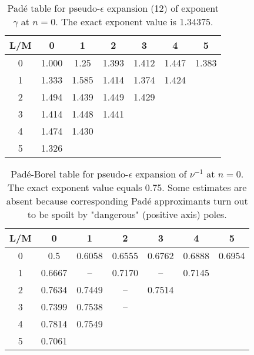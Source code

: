 \documentclass[aps,prb,preprint,showpacs,preprintnumbers,amsmath,amssymb]{revtex4}
\begin{document}
\begin{table}[t]
\caption{Pad\'e table for pseudo-$\epsilon$ expansion (12) of exponent $\gamma$
at $n = 0$. The exact exponent value is 1.34375.}
\label{tab4}
\renewcommand{\tabcolsep}{0.4cm}
\begin{tabular}{|*{7}{c|}}
              \hline
              L/M & 0 & 1 & 2 & 3 & 4 & 5 \\ \hline
              0 & 1.000 & 1.25  & 1.393 & 1.412 & 1.447 & 1.383 \\ \hline
              1 & 1.333 & 1.585 & 1.414 & 1.374 & 1.424 &       \\ \hline
              2 & 1.494 & 1.439 & 1.449 & 1.429 &       &       \\ \hline
              3 & 1.414 & 1.448 & 1.441 &       &       &       \\ \hline
              4 & 1.474 & 1.430 &       &       &       &       \\ \hline
              5 & 1.326 &       &       &       &       &
               \\ \hline
\end{tabular}
\end{table}

\begin{table}[t]
\caption{Pad\'e-Borel table for pseudo-$\epsilon$ expansion of $\nu^{-1}$ at $n = 0$.
The exact exponent value equals 0.75. Some estimates are absent because corresponding
Pad\'e approximants turn out to be spoilt by "dangerous" (positive axis) poles.}
\label{tab5}
\renewcommand{\tabcolsep}{0.4cm}
\begin{tabular}{|*{7}{c|}}\hline
L/M& 0& 1 & 2 & 3 & 4 & 5\\ \hline
0 & 0.5 & 0.6058 & 0.6555 & 0.6762 & 0.6888 & 0.6954 \\ \hline
1 & 0.6667 & -- & 0.7170 & -- & 0.7145 & \\ \hline
2 & 0.7634 & 0.7449 & -- & 0.7514& & \\ \hline
3 & 0.7399 & 0.7538 & -- & & & \\ \hline
4 & 0.7814 & 0.7549 & & & & \\ \hline
5 & 0.7061 & & & & & \\ \hline
\end{tabular}
\end{table}
\end{document}
